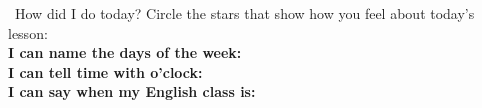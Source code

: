 \vspace{1em}
\begin{grammartip}{ \ How did I do today?}
  Circle the stars that show how you feel about today's lesson:\\[6pt]
  \textbf{I can name the days of the week:} \selfcheck[0] \\[4pt]
  \textbf{I can tell time with o'clock:} \selfcheck[0] \\[4pt]
  \textbf{I can say when my English class is:} \selfcheck[0]
\end{grammartip}
